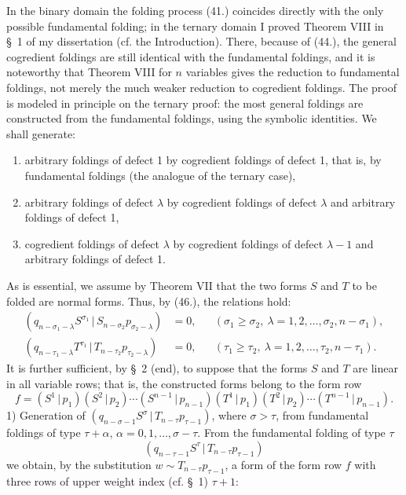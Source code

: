 \documentclass[11pt]{article}
\providecommand{\pair}[2]{(#1\,|\,#2)}
\begin{document}
In the binary domain the folding process (41.) coincides directly with the only possible fundamental folding; in the ternary domain I proved Theorem VIII in \S\ 1 of my dissertation (cf. the Introduction). There, because of (44.), the general cogredient foldings are still identical with the fundamental foldings, and it is noteworthy that Theorem VIII for $n$ variables gives the reduction to fundamental foldings, not merely the much weaker reduction to cogredient foldings. The proof is modeled in principle on the ternary proof: the most general foldings are constructed from the fundamental foldings, using the symbolic identities. We shall generate:
\begin{enumerate}
\item arbitrary foldings of defect 1 by cogredient foldings of defect 1, that is, by fundamental foldings (the analogue of the ternary case),
\item arbitrary foldings of defect $\lambda$ by cogredient foldings of defect $\lambda$ and arbitrary foldings of defect 1,
\item cogredient foldings of defect $\lambda$ by cogredient foldings of defect $\lambda-1$ and arbitrary foldings of defect 1.
\end{enumerate}
As is essential, we assume by Theorem VII that the two forms $S$ and $T$ to be folded are normal forms. Thus, by (46.), the relations hold:
\begin{equation}
\begin{aligned}
\pair{q_{n-\sigma_1-\lambda}S^{\sigma_1}}{S_{n-\sigma_2}p_{\sigma_2-\lambda}}&=0,
&& (\sigma_1\ge\sigma_2,\ \lambda=1,2,\ldots,\sigma_2,n-\sigma_1),\\
\pair{q_{n-\tau_1-\lambda}T^{\tau_1}}{T_{n-\tau_2}p_{\tau_2-\lambda}}&=0,
&& (\tau_1\ge\tau_2,\ \lambda=1,2,\ldots,\tau_2,n-\tau_1).
\end{aligned}
\tag{62}
\end{equation}
It is further sufficient, by \S\ 2 (end), to suppose that the forms $S$ and $T$ are linear in all variable rows; that is, the constructed forms belong to the form row
\[
 f=\pair{S^1}{p_1}\pair{S^2}{p_2}\cdots\pair{S^{n-1}}{p_{n-1}}
   \pair{T^1}{p_1}\pair{T^2}{p_2}\cdots\pair{T^{n-1}}{p_{n-1}}.
\]
1) Generation of $\pair{q_{n-\sigma-1}S^\sigma}{T_{n-\tau}p_{\tau-1}}$, where $\sigma>\tau$, from fundamental foldings of type $\tau+\alpha$, $\alpha=0,1,\ldots,\sigma-\tau$. From the fundamental folding of type $\tau$
\[
 \pair{q_{n-\tau-1}S^\tau}{T_{n-\tau}p_{\tau-1}}
\]
we obtain, by the substitution $w\sim T_{n-\tau}p_{\tau-1}$, a form of the form row $f$ with three rows of upper weight index (cf. \S\ 1) $\tau+1$:
\end{document}
